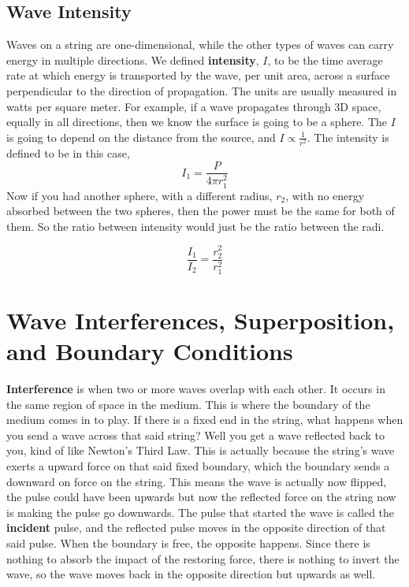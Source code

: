 \subsection{Wave Intensity}
Waves on a string are one-dimensional, while the other types of waves can carry energy in multiple directions. We defined \textbf{intensity}, $I$, to be the time average rate at which energy is transported by the wave, per unit area, across a surface perpendicular to the direction of propagation. The units are usually measured in watts per square meter. For example, if a wave propagates through 3D space, equally in all directions, then we know the surface is going to be a sphere. The $I$ is going to depend on the distance from the source, and $I \propto \frac{1}{r^2}$. 
The intensity is defined to be in this case, 
\begin{equation*}
	I_1 = \frac{P}{4\pi r_1^2}
\end{equation*}
Now if you had another sphere, with a different radius, $r_2$, with no energy absorbed between the two spheres, then the power must be the same for both of them. So the ratio between intensity would just be the ratio between the radi.

\begin{equation*}
	\frac{I_1}{I_2} = \frac{r_2^2}{r_1^2}
\end{equation*}

\section{Wave Interferences, Superposition, and Boundary Conditions}
\textbf{Interference} is when two or more waves overlap with each other. It occurs in the same region of space in the medium. This is where the boundary of the medium comes in to play. If there is a fixed end in the string, what happens when you send a wave across that said string? Well you get a wave reflected back to you, kind of like Newton's Third Law. This is actually because the string's wave exerts a upward force on that said fixed boundary, which the boundary sends a downward on force on the string. This means the wave is actually now flipped, the pulse could have been upwards but now the reflected force on the string now is making the pulse go downwards. The pulse that started the wave is called the \textbf{incident} pulse, and the reflected pulse moves in the opposite direction of that said pulse. When the boundary is free, the opposite happens. Since there is nothing to absorb the impact of the restoring force, there is nothing to invert the wave, so the wave moves back in the opposite direction but upwards as well. 

